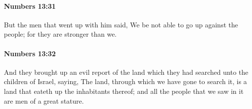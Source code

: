 		\paragraph{Numbers 13:31} %
			\label{NUMBERS-13-31}

			But the men that went up with him said, We be not able to go up against the people; for they are stronger than we.


		\paragraph{Numbers 13:32} %
			\label{NUMBERS-13-32}

			And they brought up an evil report of the land which they had searched unto the children of Israel, saying, The land, through which we have gone to search it, is a land that eateth up the inhabitants thereof; and all the people that we saw in it are men of a great stature.


